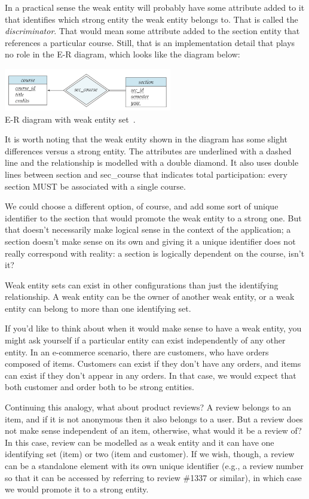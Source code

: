 In a practical sense the weak entity will probably have some attribute added to it that identifies which strong entity the weak entity belongs to. That is called the \textit{discriminator}. That would mean some attribute added to the section entity that references a particular course. Still, that is an implementation detail that plays no role in the E-R diagram, which looks like the diagram below:

\begin{center}
\includegraphics[width=0.55\textwidth]{images/weak-entity-set}\\
E-R diagram with weak entity set~\cite{dsc}.
\end{center}

It is worth noting that the weak entity shown in the diagram has some slight differences versus a strong entity. The attributes are underlined with a dashed line and the relationship is modelled with a double diamond. It also uses double lines between section and sec\_course that indicates total participation: every section MUST be associated with a single course.

We could choose a different option, of course, and add some sort of unique identifier to the section that would promote the weak entity to a strong one. But that doesn't necessarily make logical sense in the context of the application; a section doesn't make sense on its own and giving it a unique identifier does not really correspond with reality: a section is logically dependent on the course, isn't it?

Weak entity sets can exist in other configurations than just the identifying relationship. A weak entity can be the owner of another weak entity, or a weak entity can belong to more than one identifying set.

If you'd like to think about when it would make sense to have a weak entity, you might ask yourself if a particular entity can exist independently of any other entity. In an e-commerce scenario, there are customers, who have orders composed of items. Customers can exist if they don't have any orders, and items can exist if they don't appear in any orders. In that case, we would expect that both customer and order both to be strong entities.

Continuing this analogy, what about product reviews? A review belongs to an item, and if it is not anonymous then it also belongs to a user. But a review does not make sense independent of an item, otherwise, what would it be a review of? In this case, review can be modelled as a weak entity and it can have one identifying set (item) or two (item and customer). If we wish, though, a review can be a standalone element with its own unique identifier (e.g., a review number so that it can be accessed by referring to review \#1337 or similar), in which case we would promote it to a strong entity.

